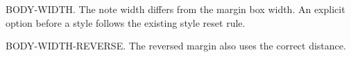 \documentclass{article}
\begin{document}
BODY-WIDTH. The note width differs from the margin box width.
An explicit option before a style follows the existing style reset rule.
\par\vspace{4cm}
\reversemarginpar
BODY-WIDTH-REVERSE. The reversed margin also uses the correct distance.
\end{document}
